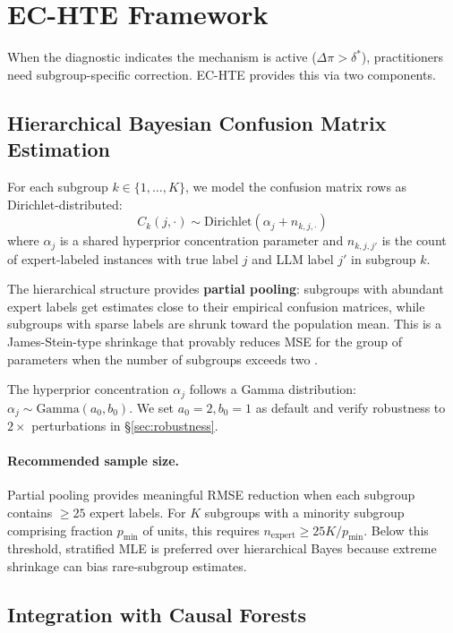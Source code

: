 \documentclass[11pt,a4paper]{article}
\begin{document}
\section{EC-HTE Framework}
\label{sec:method}

When the diagnostic indicates the mechanism is active ($\Delta\pi > \delta^*$), practitioners need subgroup-specific correction.
EC-HTE provides this via two components.

\subsection{Hierarchical Bayesian Confusion Matrix Estimation}

For each subgroup $k \in \{1,\ldots,K\}$, we model the confusion matrix rows as Dirichlet-distributed:
\begin{equation}
C_k(j, \cdot) \sim \text{Dirichlet}(\alpha_{j} + n_{k,j,\cdot})
\end{equation}
where $\alpha_j$ is a shared hyperprior concentration parameter and $n_{k,j,j'}$ is the count of expert-labeled instances with true label $j$ and LLM label $j'$ in subgroup $k$.

The hierarchical structure provides \textbf{partial pooling}: subgroups with abundant expert labels get estimates close to their empirical confusion matrices, while subgroups with sparse labels are shrunk toward the population mean.
This is a James-Stein-type shrinkage that provably reduces MSE for the group of parameters when the number of subgroups exceeds two \cite{efron2012large}.

The hyperprior concentration $\alpha_j$ follows a Gamma distribution: $\alpha_j \sim \text{Gamma}(a_0, b_0)$.
We set $a_0 = 2, b_0 = 1$ as default and verify robustness to $2\times$ perturbations in \S\ref{sec:robustness}.

\paragraph{Recommended sample size.}
Partial pooling provides meaningful RMSE reduction when each subgroup contains $\geq 25$ expert labels.
For $K$ subgroups with a minority subgroup comprising fraction $p_{\min}$ of units, this requires $n_{\text{expert}} \geq 25K / p_{\min}$.
Below this threshold, stratified MLE is preferred over hierarchical Bayes because extreme shrinkage can bias rare-subgroup estimates.

\subsection{Integration with Causal Forests}
\end{document}
